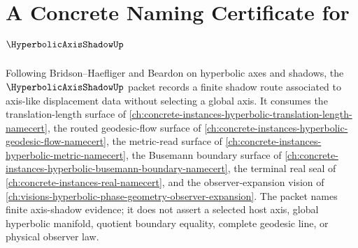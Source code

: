 \chapter{A Concrete Naming Certificate for $\HyperbolicAxisShadowUp$}
\label{ch:concrete-instances-hyperbolic-axis-shadow-namecert}

Following Bridson--Haefliger and Beardon on hyperbolic axes and shadows, the $\HyperbolicAxisShadowUp$ packet records a finite shadow route associated to axis-like displacement data without selecting a global axis. It consumes the translation-length surface of \autoref{ch:concrete-instances-hyperbolic-translation-length-namecert}, the routed geodesic-flow surface of \autoref{ch:concrete-instances-hyperbolic-geodesic-flow-namecert}, the metric-read surface of \autoref{ch:concrete-instances-hyperbolic-metric-namecert}, the Busemann boundary surface of \autoref{ch:concrete-instances-hyperbolic-busemann-boundary-namecert}, the terminal real seal of \autoref{ch:concrete-instances-real-namecert}, and the observer-expansion vision of \autoref{ch:visions-hyperbolic-phase-geometry-observer-expansion}. The packet names finite axis-shadow evidence; it does not assert a selected host axis, global hyperbolic manifold, quotient boundary equality, complete geodesic line, or physical observer law.

